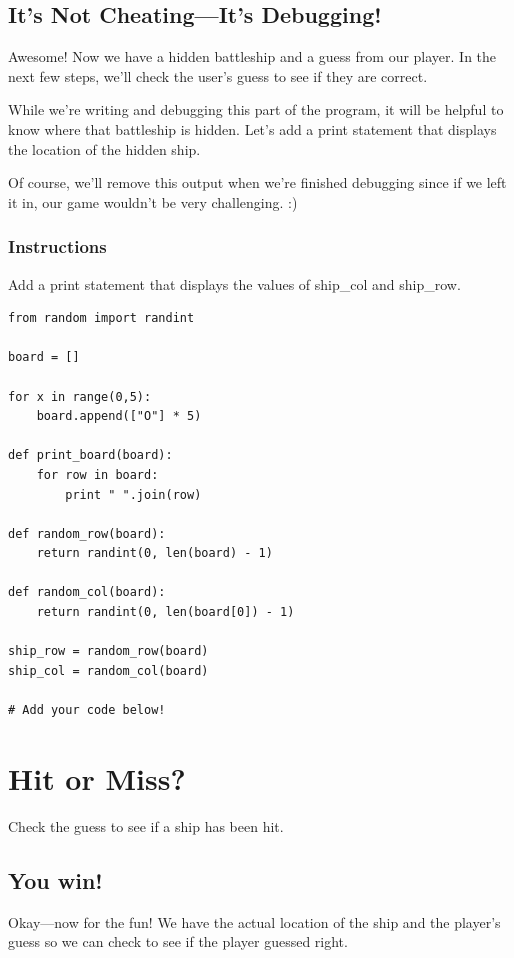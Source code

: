 \documentclass[12pt,a4paper,final,twoside,onecolumn,titlepage]{book}
\begin{document}
\subsection{It's Not Cheating—It's Debugging!}

Awesome! Now we have a hidden battleship and a guess from our player. In the next few steps, we'll check the user's guess to see if they are correct.

While we're writing and debugging this part of the program, it will be helpful to know where that battleship is hidden. Let's add a print statement that displays the location of the hidden ship.

Of course, we'll remove this output when we're finished debugging since if we left it in, our game wouldn't be very challenging. :)
\subsubsection{Instructions}

Add a print statement that displays the values of ship\_col and ship\_row.

\begin{lstlisting}
from random import randint

board = []

for x in range(0,5):
    board.append(["O"] * 5)

def print_board(board):
    for row in board:
        print " ".join(row)

def random_row(board):
    return randint(0, len(board) - 1)

def random_col(board):
    return randint(0, len(board[0]) - 1)

ship_row = random_row(board)
ship_col = random_col(board)

# Add your code below!

\end{lstlisting}
    
\section{Hit or Miss?}
Check the guess to see if a ship has been hit.
\subsection{You win!}

Okay—now for the fun! We have the actual location of the ship and the player's guess so we can check to see if the player guessed right.
\end{document}
